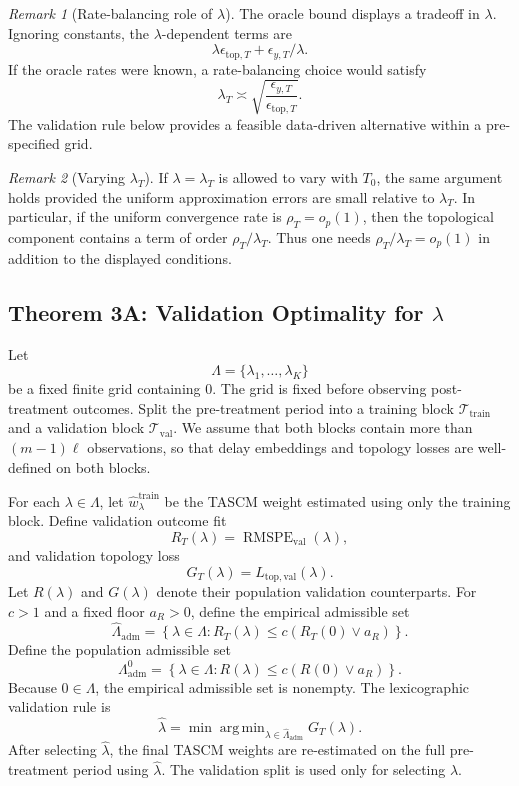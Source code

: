 \documentclass[11pt]{article}
\theoremstyle{plain}
\theoremstyle{definition}
\theoremstyle{remark}
\newtheorem{remark}[remark]{Remark}
\DeclareMathOperator{\RMSPE}{RMSPE}
\DeclareMathOperator*{\argmin}{arg\,min}
\newcommand{\1}{\mathbbm{1}}
\newcommand{\train}{\mathrm{train}}
\newcommand{\val}{\mathrm{val}}
\newcommand{\adm}{\mathrm{adm}}
\begin{document}
\begin{remark}[Rate-balancing role of \(\lambda\)]
The oracle bound displays a tradeoff in \(\lambda\). Ignoring constants, the
\(\lambda\)-dependent terms are
\[
\lambda\epsilon_{\mathrm{top},T}
+
\epsilon_{y,T}/\lambda.
\]
If the oracle rates were known, a rate-balancing choice would satisfy
\[
\lambda_T
\asymp
\sqrt{
\frac{\epsilon_{y,T}}{\epsilon_{\mathrm{top},T}}
}.
\]
The validation rule below provides a feasible data-driven alternative within a
pre-specified grid.
\end{remark}

\begin{remark}[Varying \(\lambda_T\)]
If \(\lambda=\lambda_T\) is allowed to vary with \(T_0\), the same argument
holds provided the uniform approximation errors are small relative to
\(\lambda_T\). In particular, if the uniform convergence rate is
\(\rho_T=o_p(1)\), then the topological component contains a term of order
\(\rho_T/\lambda_T\). Thus one needs \(\rho_T/\lambda_T=o_p(1)\) in addition to
the displayed conditions.
\end{remark}

\subsection{Theorem 3A: Validation Optimality for \texorpdfstring{\(\lambda\)}{lambda}}

Let
\[
\Lambda=\{\lambda_1,\ldots,\lambda_K\}
\]
be a fixed finite grid containing \(0\). The grid is fixed before observing
post-treatment outcomes. Split the pre-treatment period into a training block
\(\mathcal T_{\train}\) and a validation block \(\mathcal T_{\val}\). We assume
that both blocks contain more than \((m-1)\ell\) observations, so that delay
embeddings and topology losses are well-defined on both blocks.

For each \(\lambda\in\Lambda\), let
\(\widehat w_\lambda^{\train}\) be the TASCM weight estimated using only the
training block. Define validation outcome fit
\[
R_T(\lambda)
=
\RMSPE_{\val}(\lambda),
\]
and validation topology loss
\[
G_T(\lambda)
=
L_{\mathrm{top},\val}(\lambda).
\]
Let \(R(\lambda)\) and \(G(\lambda)\) denote their population validation
counterparts. For \(c>1\) and a fixed floor \(a_R>0\), define the empirical
admissible set
\[
\widehat\Lambda_{\adm}
=
\left\{
\lambda\in\Lambda:
R_T(\lambda)
\le
c\left(R_T(0)\vee a_R\right)
\right\}.
\]
Define the population admissible set
\[
\Lambda_{\adm}^0
=
\left\{
\lambda\in\Lambda:
R(\lambda)
\le
c\left(R(0)\vee a_R\right)
\right\}.
\]
Because \(0\in\Lambda\), the empirical admissible set is nonempty. The
lexicographic validation rule is
\[
\widehat\lambda
=
\min
\argmin_{\lambda\in\widehat\Lambda_{\adm}}
G_T(\lambda).
\]
After selecting \(\widehat\lambda\), the final TASCM weights are re-estimated on
the full pre-treatment period using \(\widehat\lambda\). The validation split is
used only for selecting \(\lambda\).
\end{document}
